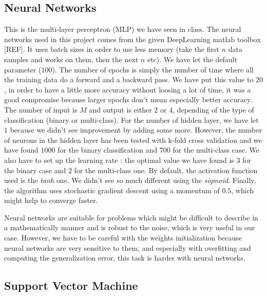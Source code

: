 \documentclass{article} %
\begin{document}
\subsection{Neural Networks}

This is the multi-layer perceptron (MLP) we have seen in class. The neural networks used in this project comes from the given DeepLearning matlab toolbox [REF]. It uses batch sizes in order to use less memory (take the first $n$ data samples and works on them, then the next $n$ etc). We have let the default parameter ($100$). The number of epochs is simply the number of time where all the training data do a forward and a backward pass. We have put this value to $20$, in order to have a little more accuracy without loosing a lot of time, it was a good compromise because larger epochs don't mean especially better accuracy. The number of input is $M$ and output is either $2$ or $4$, depending of the type of classification (binary or multi-class). For the number of hidden layer, we have let $1$ because we didn't see improvement by adding some more. However, the number of neurons in the hidden layer has been tested with k-fold cross validation and we have found $1000$ for the binary classification and $700$ for the multi-class case. We also have to set up the learning rate : the optimal value we have found is $3$ for the binary case and $2$ for the multi-class one. By default, the activation function used is the \textit{tanh} one. We didn't see so much different using the \textit{sigmoid}. Finally, the algorithm uses stochastic gradient descent using a momentum of $0.5$, which might help to converge faster.

Neural networks are suitable for problems which might be difficult to describe in a mathematically manner and is robust to the noise, which is very useful in our case. However, we have to be careful with the weights initialization because neural networks are very sensitive to them, and especially with overfitting and computing the generalization error, this task is harder with neural networks.

\subsection{Support Vector Machine}
\end{document}
